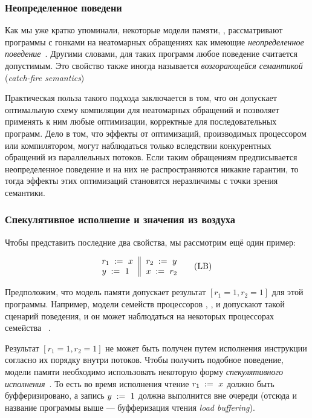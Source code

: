 \subsubsection{Неопределенное поведени}
\label{sec:background:ub}

Как мы уже кратко упоминали, некоторые модели памяти,
\eg \CPP, рассматривают программы с гонками 
на неатомарных обращениях как имеющие 
\emph{неопределенное поведение}~\cite{Boehm-Adve:PLDI08}.
Другими словами, для таких программ любое поведение считается допустимым. 
Это свойство также иногда называется 
\emph{возгорающейся семантикой} (\emph{catch-fire semantics})
 
Практическая польза такого подхода заключается в том,
что он допускает оптимальную схему компиляции для 
неатомарных обращений и позволяет применять к ним 
любые оптимизации, корректные для последовательных программ.
Дело в том, что эффекты от оптимизаций, производимых 
процессором или компилятором, могут наблюдаться 
только вследствии конкурентных обращений 
из параллельных потоков. Если таким обращениям 
предписывается неопределенное поведение и на них 
не распространяются никакие гарантии, 
то тогда эффекты этих оптимизаций 
становятся неразличимы с точки зрения семантики. 
 
\subsubsection{Спекулятивное исполнение и значения из воздуха}
\label{sec:background:oota}

Чтобы представить последние два свойства, мы рассмотрим ещё один пример:

\begin{equation*}
\inarrII{
  \readInst{}{r_1}{x}     \\
  \writeInst{}{y}{1}      \\
}{
  \readInst{}{r_2}{y}     \\
  \writeInst{}{x}{r_2}    \\
}
\tag{LB}\label{ex:lb}
\end{equation*}

Предположим, что модель памяти допускает 
результат ${[r_1=1, r_2=1]}$ для этой программы. 
Например, модели семейств процессоров 
, , и \POWER
допускают такой сценарий поведения, 
и он может наблюдаться на некоторых процессорах семейства 
~\cite{Maranget-al:Tutorial2012}.

Результат ${[r_1=1, r_2=1]}$ не может быть получен 
путем исполнения инструкции согласно их порядку внутри потоков.
Чтобы получить подобное поведение, 
модели памяти необходимо использовать 
некоторую форму \emph{спекулятивного исполнения}~\cite{Boudol-Petri:ESOP10, Boehm-Demsky:MSPC14}.
То есть во время исполнения чтение $r_1\;:=_{}\;x$
должно быть буфферизировано, а запись $y\;:=_{}\;1$ 
должна выполнится вне очереди 
(отсюда и название программы выше --- 
буфферизация чтения \emph{load buffering}).

